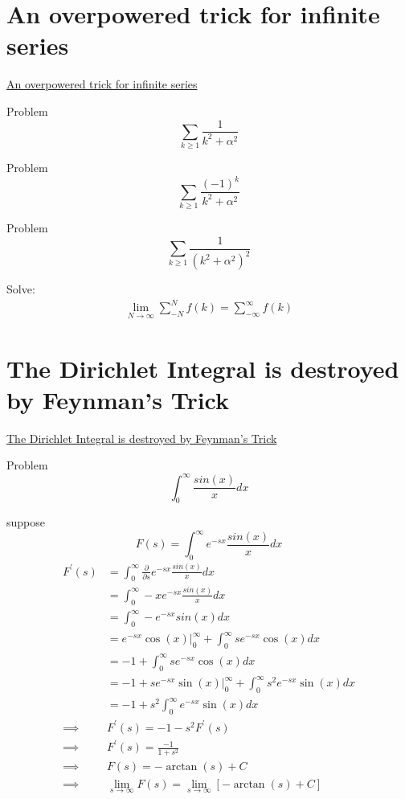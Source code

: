 \documentclass {article}
\begin{document}
\section{An overpowered trick for infinite series}
\href{https://www.youtube.com/watch?v=gd7FmQAVNmk}{An overpowered trick for infinite series}

Problem \[ \sum_{k \ge 1} \frac{1}{k^{2} + \alpha^{2}} \]

Problem \[ \sum_{k \ge 1} \frac{\left (-1\right)^k}{k^{2} + \alpha^{2}}\]

Problem \[ \sum_{k \ge 1} \frac{1}{\left(k^{2} + \alpha^{2}\right)^2}\]


Solve:\\
\[
\begin{matrix}
 \lim\limits_{N \to \infty}\displaystyle\sum_{-N}^{N}f(k) = \displaystyle\sum_{-\infty}^{\infty} f(k)
\end{matrix}
\]


\section{The Dirichlet Integral is destroyed by Feynman's Trick}
\href{https://www.youtube.com/watch?v=ZZccxuOpb4k}{The Dirichlet Integral is destroyed by Feynman's Trick}

Problem \[ \int_{0}^{\infty} \frac {sin\left(x\right)}{x} {d}x \]

suppose \[ F\left(s\right) = \int_{0}^{\infty} e^{-sx}\frac{sin(x)}{x} {d}x\]
\[
\begin{matrix}
 F^{'}(s)  & = \int_{0}^{\infty} \frac{\partial}{\partial{s}} e^{-sx}\frac{sin(x)}{x} {d}x  \\
           & = \int_{0}^{\infty} -xe^{-sx} \frac{sin(x)}{x} {d}x  \\
           & = \int_{0}^{\infty} -e^{-sx} sin(x) {d}x \\
           & = e^{-sx}\cos(x)\Big|_{0}^{\infty} + \int_{0}^{\infty}se^{-sx}\cos(x){d}x \\
           & = -1 + \int_{0}^{\infty}se^{-sx}\cos(x){d}x \\
           & = -1 + se^{-sx}\sin(x)\Big|_{0}^{\infty} + \int_{0}^{\infty}s^{2}e^{-sx}\sin(x){d}x \\
           & = -1 + s^{2}\int_{0}^{\infty}e^{-sx}\sin(x){d}x \\           
 \implies  & F^{'}(s) = -1 - s^{2}F^{'}(s) \\
 \implies & F^{'}(s) = \frac {-1} {1+s^{2}} \\
 \implies & F(s) = -\arctan(s) + C \\
 \implies & \lim\limits_{s \to \infty} F(s) = \lim\limits_{s \to \infty}\left[-\arctan(s) + C\right] \\
\end{matrix}
\]
\end{document}

